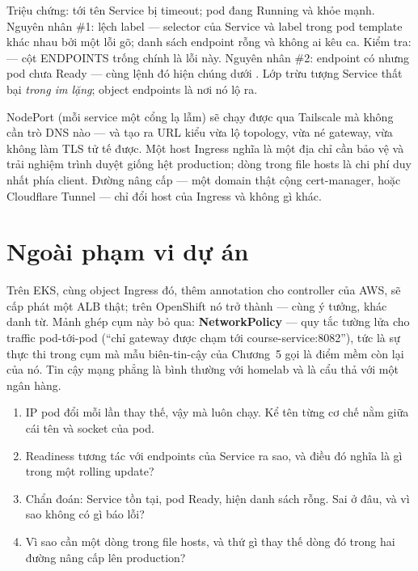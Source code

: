\begin{pitfall}
Triệu chứng:  tới tên Service bị timeout; pod đang Running và
khỏe mạnh. Nguyên nhân \#1: lệch label --- selector của Service và label
trong pod template khác nhau bởi một lỗi gõ; danh sách endpoint rỗng và
không ai kêu ca. Kiểm tra:  --- cột ENDPOINTS trống chính là lỗi này. Nguyên nhân
\#2: endpoint có nhưng pod chưa Ready --- cùng lệnh đó hiện chúng dưới
. Lớp trừu tượng Service thất bại
\emph{trong im lặng}; object endpoints là nơi nó lộ ra.
\end{pitfall}

\begin{decision}
NodePort (mỗi service một cổng lạ lẫm) sẽ chạy được qua Tailscale mà
không cần trò DNS nào --- và tạo ra URL kiểu
 vừa lộ topology, vừa né gateway, vừa không
làm TLS tử tế được. Một host Ingress nghĩa là một địa chỉ cần bảo vệ và
trải nghiệm trình duyệt giống hệt production; dòng 
trong file hosts là chi phí duy nhất phía client. Đường nâng cấp ---
một domain thật cộng cert-manager, hoặc Cloudflare Tunnel --- chỉ đổi
host của Ingress và không gì khác.
\end{decision}

\section{Ngoài phạm vi dự án}

Trên EKS, cùng object Ingress đó, thêm annotation cho controller của
AWS, sẽ cấp phát một ALB thật; trên OpenShift nó trở thành
 --- cùng ý tưởng, khác danh từ. Mảnh ghép cụm này bỏ qua:
\textbf{NetworkPolicy} --- quy tắc tường lửa cho traffic pod-tới-pod
(``chỉ gateway được chạm tới course-service:8082''), tức là sự thực thi
trong cụm mà mẫu biên-tin-cậy của Chương~5 gọi là điểm mềm còn lại của
nó. Tin cậy mạng phẳng là bình thường với homelab và là cẩu thả với một
ngân hàng.

\begin{quiz}
\begin{enumerate}
  \item IP pod đổi mỗi lần thay thế, vậy mà 
  luôn chạy. Kể tên từng cơ chế nằm giữa cái tên và socket của pod.
  \item Readiness tương tác với endpoints của Service ra sao, và điều
  đó nghĩa là gì trong một rolling update?
  \item Chẩn đoán: Service tồn tại, pod Ready, 
  hiện danh sách rỗng. Sai ở đâu, và vì sao không có gì báo lỗi?
  \item Vì sao  cần một dòng trong file hosts, và thứ gì
  thay thế dòng đó trong hai đường nâng cấp lên production?
\end{enumerate}
\end{quiz}
